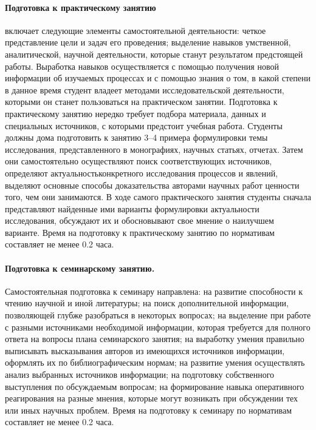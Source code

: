 {\paragraph{Подготовка к практическому занятию}
включает следующие элементы самостоятельной деятельности: четкое представление
цели и задач его проведения; выделение навыков умственной, аналитической, научной
деятельности, которые станут результатом предстоящей работы. Выработка навыков
осуществляется с помощью получения новой информации об изучаемых процессах и с
помощью знания о том, в какой степени в данное время студент владеет методами
исследовательской деятельности, которыми он станет пользоваться на практическом
занятии. Подготовка к практическому занятию нередко требует подбора материала,
данных и специальных источников, с которыми предстоит учебная работа. Студенты
должны дома подготовить к занятию 3--4 примера формулировки темы исследования,
представленного в монографиях, научных статьях, отчетах. Затем они самостоятельно
осуществляют поиск соответствующих источников, определяют актуальностьконкретного исследования процессов и явлений, выделяют основные способы доказательства авторами научных работ ценности того, чем они занимаются. В ходе
самого практического занятия студенты сначала представляют найденные ими варианты
формулировки актуальности исследования, обсуждают их и обосновывают свое мнение о
наилучшем варианте. Время на подготовку к практическому занятию по нормативам
составляет не менее 0.2 часа.\par
\paragraph{Подготовка к семинарскому занятию.} Самостоятельная подготовка к семинару
направлена: на развитие способности к чтению научной и иной литературы; на поиск
дополнительной информации, позволяющей глубже разобраться в некоторых вопросах; на
выделение при работе с разными источниками необходимой информации, которая
требуется для полного ответа на вопросы плана семинарского занятия; на выработку
умения правильно выписывать высказывания авторов из имеющихся источников
информации, оформлять их по библиографическим нормам; на развитие умения
осуществлять анализ выбранных источников информации; на подготовку собственного
выступления по обсуждаемым вопросам; на формирование навыка оперативного
реагирования на разные мнения, которые могут возникать при обсуждении тех или иных
научных проблем. Время на подготовку к семинару по нормативам составляет не менее
0.2 часа.\par
}
